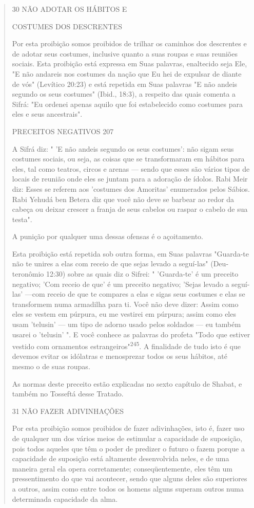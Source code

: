 \begin{quote}
30 NÃO ADOTAR OS HÁBITOS E

COSTUMES DOS DESCRENTES

Por esta proibição somos proibidos de trilhar os caminhos dos
des­crentes e de adotar seus costumes, inclusive quanto a suas roupas e
suas reu­niões sociais. Esta proibição está expressa em Suas palavras,
enaltecido seja Ele, "E não andareis nos costumes da nação que Eu hei de
expulsar de diante de vós" (Levítico 20:23) e está repetida em Suas
palavras "E não andeis segundo os seus costumes" (Ibid., 18:3), a
respeito das quais comenta a Sifrá: "Eu ordenei ape­nas aquilo que foi
estabelecido como costumes para eles e seus ancestrais".

PRECEITOS NEGATIVOS 207

A Sifrá diz: " 'E não andeis segundo os seus costumes': não sigam seus
costumes sociais, ou seja, as coisas que se transformaram em hábitos
para eles, tal como teatros, circos e arenas --- sendo que esses são
vários tipos de locais de reunião onde eles se juntam para a adoração de
ídolos. Rabi Meir diz: Esses se referem aos 'costumes dos Amoritas'
enumerados pelos Sábios. Rabi Yehudá ben Betera diz que você não deve se
barbear ao redor da cabeça ou deixar crescer a franja de seus cabelos ou
raspar o cabelo de sua testa".

A punição por qualquer uma dessas ofensas é o açoitamento.

Esta proibição está repetida sob outra forma, em Suas palavras
"Guarda-te não te unires a elas com receio de que sejas levado a
seguí-las" (Deu­teronômio 12:30) sobre as quais diz o Sifrei: "
'Guarda-te' é um preceito nega­tivo; 'Com receio de que' é um preceito
negativo; 'Sejas levado a seguí-las' ---com receio de que te compares a
elas e sigas seus costumes e elas se transfor­mem numa armadilha para
ti. Você não deve dizer: Assim como eles se vestem em púrpura, eu me
vestirei em púrpura; assim como eles usam 'telusin' --- um tipo de
adorno usado pelos soldados --- eu também usarei o 'telusin' ". E você
conhece as palavras do profeta "Todo que estiver vestido com ornamentos
es­trangeiros"\textsuperscript{245}. A finalidade de tudo isto é que
devemos evitar os idólatras e menosprezar todos os seus hábitos, até
mesmo o de suas roupas.

As normas deste preceito estão explicadas no sexto capítulo de Sha­bat,
e também no Tosseftá desse Tratado.

31 NÃO FAZER ADIVINHAÇÕES

Por esta proibição somos proibidos de fazer adivinhações, isto é, fa­zer
uso de qualquer um dos vários meios de estimular a capacidade de
suposi­ção, pois todos aqueles que têm o poder de predizer o futuro o
fazem porque a capacidade de suposição está altamente desenvolvida
neles, e de uma manei­ra geral ela opera corretamente; conseqüentemente,
eles têm um pressentimento do que vai acontecer, sendo que alguns deles
são superiores a outros, assim como entre todos os homens alguns superam
outros numa determinada capa­cidade da alma.


\end{quote}
